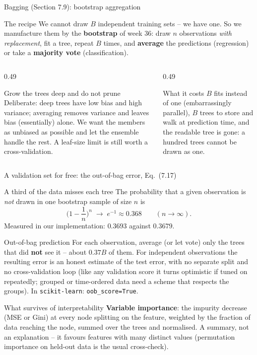 \documentclass[10pt,aspectratio=169]{beamer}
\begin{document}
\begin{frame}{Bagging (Section 7.9): bootstrap aggregation}
\begin{block}{The recipe}
We cannot draw $B$ independent training sets -- we have one.  So we
manufacture them by the \textbf{bootstrap} of week 36: draw $n$ observations
\emph{with replacement}, fit a tree, repeat $B$ times, and \textbf{average}
the predictions (regression) or take a \textbf{majority vote}
(classification).
\end{block}
\begin{columns}[T]
\begin{column}{0.49\textwidth}
\begin{block}{Grow the trees deep and do not prune}
Deliberate: deep trees have low bias and high variance; averaging removes
variance and leaves bias (essentially) alone.  We want the members as
unbiased as possible and let the ensemble handle the rest.  A leaf-size
limit is still worth a cross-validation.
\end{block}
\end{column}
\begin{column}{0.49\textwidth}
\begin{block}{What it costs}
$B$ fits instead of one (embarrassingly parallel), $B$ trees to store and
walk at prediction time, and the readable tree is gone: a hundred trees
cannot be drawn as one.
\end{block}
\end{column}
\end{columns}
\end{frame}

\begin{frame}{A validation set for free: the out-of-bag error, Eq.\ (7.17)}
\footnotesize
\begin{block}{A third of the data misses each tree}
The probability that a given observation is \emph{not} drawn in one
bootstrap sample of size $n$ is
\[
  \Big(1-\frac1n\Big)^{n}\;\longrightarrow\;e^{-1}\approx 0.368
  \qquad(n\to\infty).
\]
Measured in our implementation: $0.3693$ against $0.3679$.
\end{block}
\begin{block}{Out-of-bag prediction}
For each observation, average (or let vote) only the trees that did
\textbf{not} see it -- about $0.37B$ of them.  For independent observations
the resulting error is an honest estimate of the test error, with no
separate split and no cross-validation loop (like any validation score it
turns optimistic if tuned on repeatedly; grouped or time-ordered data need
a scheme that respects the groups).  In \texttt{scikit-learn}:
\texttt{oob\_score=True}.
\end{block}
\begin{block}{What survives of interpretability}
\textbf{Variable importance}: the impurity decrease (MSE or Gini) at every
node splitting on the feature, weighted by the fraction of data reaching
the node, summed over the trees and normalised.  A summary, not an
explanation -- it favours features with many distinct values (permutation
importance on held-out data is the usual cross-check).
\end{block}
\end{frame}
\end{document}
